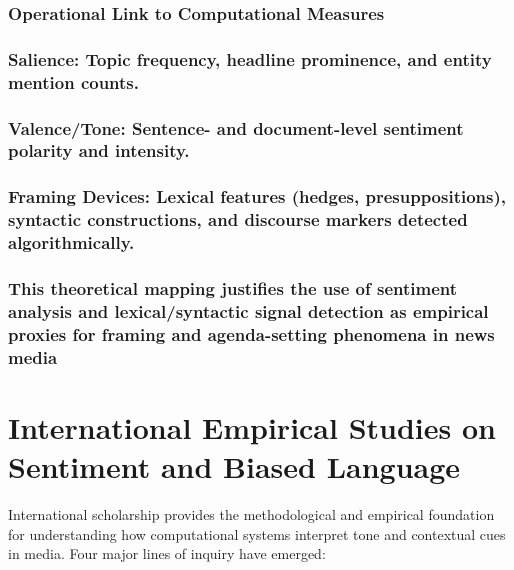 \subsubsection{\texorpdfstring{\textbf{Operational Link to Computational Measures}}{Operational Link to Computational Measures}}\label{operational-link-to-computational-measures}

\subsubsection{Salience: Topic frequency, headline prominence, and entity mention counts.}\label{salience-topic-frequency-headline-prominence-and-entity-mention-counts.}

\subsubsection{Valence/Tone: Sentence- and document-level sentiment polarity and intensity.}\label{valencetone-sentence--and-document-level-sentiment-polarity-and-intensity.}

\subsubsection{Framing Devices: Lexical features (hedges, presuppositions), syntactic constructions, and discourse markers detected algorithmically.}\label{framing-devices-lexical-features-hedges-presuppositions-syntactic-constructions-and-discourse-markers-detected-algorithmically.}

\subsubsection{This theoretical mapping justifies the use of sentiment analysis and lexical/syntactic signal detection as empirical proxies for framing and agenda-setting phenomena in news media}\label{this-theoretical-mapping-justifies-the-use-of-sentiment-analysis-and-lexicalsyntactic-signal-detection-as-empirical-proxies-for-framing-and-agenda-setting-phenomena-in-news-media}

\section{International Empirical Studies on Sentiment and Biased Language}\label{international-empirical-studies-on-sentiment-and-biased-language}

International scholarship provides the methodological and empirical foundation for understanding how computational systems interpret tone and contextual cues in media. Four major lines of inquiry have emerged:

